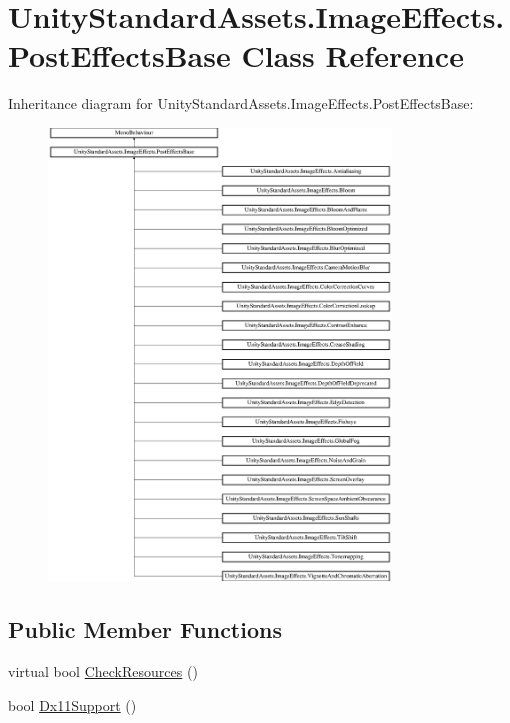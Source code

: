 \hypertarget{class_unity_standard_assets_1_1_image_effects_1_1_post_effects_base}{}\section{Unity\+Standard\+Assets.\+Image\+Effects.\+Post\+Effects\+Base Class Reference}
\label{class_unity_standard_assets_1_1_image_effects_1_1_post_effects_base}
Inheritance diagram for Unity\+Standard\+Assets.\+Image\+Effects.\+Post\+Effects\+Base\+:\begin{figure}[H]
\begin{center}
\leavevmode
\includegraphics[height=12.000000cm]{class_unity_standard_assets_1_1_image_effects_1_1_post_effects_base}
\end{center}
\end{figure}
\subsection*{Public Member Functions}
\begin{DoxyCompactItemize}
\item 
virtual bool \mbox{\hyperlink{class_unity_standard_assets_1_1_image_effects_1_1_post_effects_base_a8866612b25b7158b932efd3b832188f8}{Check\+Resources}} ()
\item 
bool \mbox{\hyperlink{class_unity_standard_assets_1_1_image_effects_1_1_post_effects_base_a0843db7636c8937b5496045ca5f99b2a}{Dx11\+Support}} ()
\end{DoxyCompactItemize}
